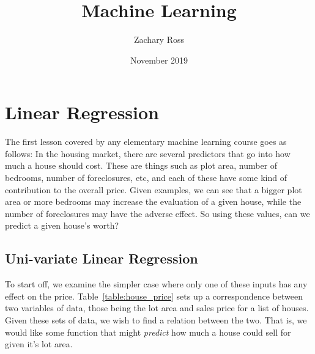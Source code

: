 \documentclass{book}[a5paper]
\title{Machine Learning}
\author{Zachary Ross}
\date{November 2019}
\begin{document}
\maketitle



\chapter{Linear Regression}

The first lesson covered by any elementary machine learning course goes as
follows: In the housing market, there are several predictors that go into how
much a house should cost. These are things such as plot area, number of
bedrooms, number of foreclosures, etc, and each of these have some kind of
contribution to the overall price. Given examples, we can see that a bigger plot
area or more bedrooms may increase the evaluation of a given house, while the
number of foreclosures may have the adverse effect. So using these values, can
we predict a given house's worth? 

\section{Uni-variate Linear Regression}


To start off, we examine the simpler case where only one of these inputs has any
effect on the price. Table~\ref{table:house_price} sets up a correspondence
between two variables of data, those being the lot area and sales price for a
list of houses. Given these sets of data, we wish to find a relation
between the two. That is, we would like some function that might \emph{predict}
how much a house could sell for given it's lot area. 
\end{document}
